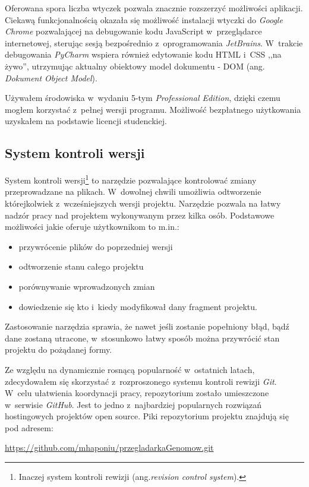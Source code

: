 \documentclass[a4paper,12pt,oneside]{mwrep}  %
\begin{document}
Oferowana spora liczba wtyczek pozwala znacznie rozszerzyć możliwości aplikacji. Ciekawą funkcjonalnością okazała się możliwość instalacji wtyczki do \emph{Google Chrome} pozwalającej na debugowanie kodu JavaScript w~przeglądarce internetowej, sterując sesją bezpośrednio z~oprogramowania \emph{JetBrains}. W~trakcie debugowania \emph{PyCharm} wspiera również edytowanie kodu HTML i~CSS ,,na żywo'', utrzymując aktualny obiektowy model dokumentu - DOM (ang. \emph{Dokument Object Model}).

Używałem środowiska w~wydaniu 5-tym \emph{Professional Edition}, dzięki czemu mogłem korzystać z~pełnej wersji programu. Możliwość bezpłatnego użytkowania uzyskałem na podstawie licencji studenckiej.

\subsection{System kontroli wersji}
System kontroli wersji\footnote{Inaczej system kontroli rewizji (ang.\emph{revision control system}).} to narzędzie pozwalające kontrolować zmiany przeprowadzane na plikach. W~dowolnej chwili umożliwia odtworzenie którejkolwiek z~wcześniejszych wersji projektu. Narzędzie pozwala na łatwy nadzór pracy nad projektem wykonywanym przez kilka osób. Podstawowe możliwości jakie oferuje użytkownikom to m.in.: %
\begin{itemize}
\item przywrócenie plików do poprzedniej wersji
\item odtworzenie stanu całego projektu
\item porównywanie wprowadzonych zmian
\item dowiedzenie się kto i~kiedy modyfikował dany fragment projektu.
\end{itemize}

Zastosowanie narzędzia sprawia, że nawet jeśli zostanie popełniony błąd, bądź dane zostaną utracone, w~stosunkowo łatwy sposób można przywrócić stan projektu do pożądanej formy. %

Ze względu na dynamicznie rosnącą popularność w~ostatnich latach, zdecydowałem się skorzystać z~rozproszonego systemu kontroli rewizji \emph{Git}. W~celu ułatwienia koordynacji pracy, repozytorium zostało umieszczone w~serwisie \emph{GitHub}. Jest to jedno z~najbardziej popularnych rozwiązań hostingowych projektów open source. Piki repozytorium projektu znajdują się pod adresem: %
\begin{center}
\url{https://github.com/mhaponiu/przegladarkaGenomow.git}
\end{center}
\end{document}
